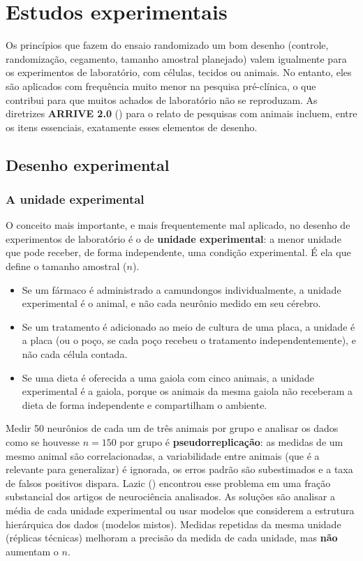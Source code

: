 \documentclass[
]{book}
\providecommand{\tightlist}{%
  \setlength{\itemsep}{0pt}\setlength{\parskip}{0pt}}
\begin{document}
\section{Estudos experimentais}\label{estudos-experimentais}

Os princípios que fazem do ensaio randomizado um bom desenho (controle, randomização, cegamento, tamanho amostral planejado) valem igualmente para os experimentos de laboratório, com células, tecidos ou animais. No entanto, eles são aplicados com frequência muito menor na pesquisa pré-clínica, o que contribui para que muitos achados de laboratório não se reproduzam. As diretrizes \textbf{ARRIVE 2.0} () para o relato de pesquisas com animais incluem, entre os itens essenciais, exatamente esses elementos de desenho.

\subsection{Desenho experimental}\label{desenho-experimental}

\subsubsection{A unidade experimental}\label{a-unidade-experimental}

O conceito mais importante, e mais frequentemente mal aplicado, no desenho de experimentos de laboratório é o de \textbf{unidade experimental}: a menor unidade que pode receber, de forma independente, uma condição experimental. É ela que define o tamanho amostral (\(n\)).

\begin{itemize}
\tightlist
\item
  Se um fármaco é administrado a camundongos individualmente, a unidade experimental é o animal, e não cada neurônio medido em seu cérebro.
\item
  Se um tratamento é adicionado ao meio de cultura de uma placa, a unidade é a placa (ou o poço, se cada poço recebeu o tratamento independentemente), e não cada célula contada.
\item
  Se uma dieta é oferecida a uma gaiola com cinco animais, a unidade experimental é a gaiola, porque os animais da mesma gaiola não receberam a dieta de forma independente e compartilham o ambiente.
\end{itemize}

Medir 50 neurônios de cada um de três animais por grupo e analisar os dados como se houvesse \(n = 150\) por grupo é \textbf{pseudorreplicação}: as medidas de um mesmo animal são correlacionadas, a variabilidade entre animais (que é a relevante para generalizar) é ignorada, os erros padrão são subestimados e a taxa de falsos positivos dispara. Lazic () encontrou esse problema em uma fração substancial dos artigos de neurociência analisados. As soluções são analisar a média de cada unidade experimental ou usar modelos que considerem a estrutura hierárquica dos dados (modelos mistos). Medidas repetidas da mesma unidade (réplicas técnicas) melhoram a precisão da medida de cada unidade, mas \textbf{não} aumentam o \(n\).
\end{document}
